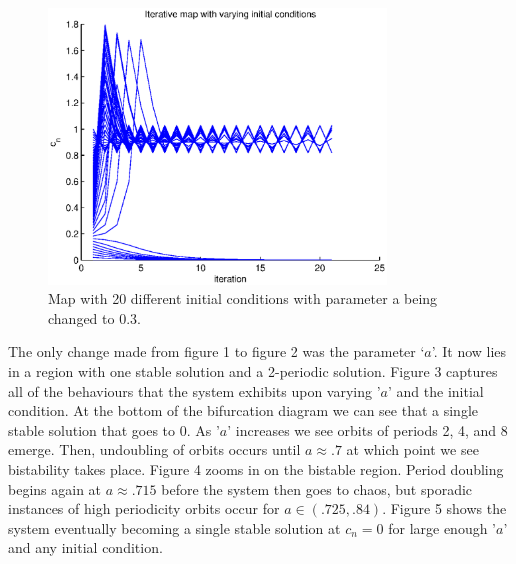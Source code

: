 \begin{figure}[H]
    \includegraphics[width=0.8\textwidth]{IterativeNumericsa03}
    \caption{Map with 20 different initial conditions with parameter a being changed to 0.3.}
    \label{Fig. 2}
\end{figure}
The only change made from figure 1 to figure 2 was the parameter `$a$'. It now lies in a region with one stable solution and a 2-periodic solution. Figure 3 captures all of the behaviours that the system exhibits upon varying '$a$' and the initial condition. At the bottom of the bifurcation diagram we can see that a single stable solution that goes to 0. As '$a$' increases we see orbits of periods 2, 4, and 8 emerge. Then, undoubling of orbits occurs until $a\approx.7$ at which point we see bistability takes place. Figure 4 zooms in on the bistable region. Period doubling begins again at $a\approx .715$ before the system then goes to chaos, but sporadic instances of high periodicity orbits occur for $a \in (.725, .84)$. Figure 5 shows the system eventually becoming a single stable solution at $c_n=0$ for large enough '$a$' and any initial condition. 

